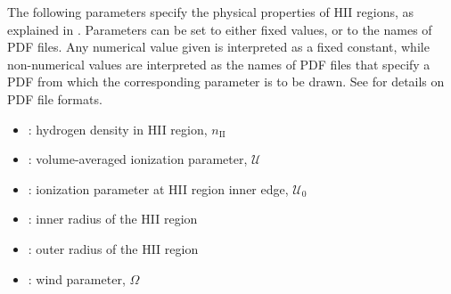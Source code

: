 \documentclass[letterpaper,10pt,english]{sphinxmanual}
\begin{document}
The following parameters specify the physical properties of HII
regions, as explained in {\hyperref[\detokenize{cloudy:sssec-cloudy-nebular-properties}]{}}. Parameters can be set to either fixed values, or to the
names of PDF files. Any numerical value given is interpreted as a
fixed constant, while non-numerical values are interpreted as the
names of PDF files that specify a PDF from which the corresponding
parameter is to be drawn. See {\hyperref[\detokenize{pdfs:sec-pdfs}]{}} for details on PDF file
formats.
\begin{itemize}
\item {} 
: hydrogen density in HII region,
\(n_{\mathrm{II}}\)

\item {} 
: volume-averaged ionization
parameter, \(\mathcal{U}\)

\item {} 
: ionization parameter at
HII region inner edge, \(\mathcal{U}_0\)

\item {} 
: inner radius of the HII region

\item {} 
: outer radius of the HII region

\item {} 
: wind parameter,
\(\Omega\)

\end{itemize}
\end{document}
